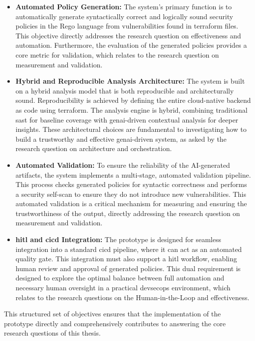 \begin{itemize}
\item \textbf{Automated Policy Generation:} The system's primary function is to automatically generate syntactically correct and logically sound security policies in the Rego language from vulnerabilities found in \gls{terraform} files. This objective directly addresses the research question on effectiveness and automation. Furthermore, the evaluation of the generated policies provides a core metric for validation, which relates to the research question on measurement and validation.

\item \textbf{Hybrid and Reproducible Analysis Architecture:} The system is built on a hybrid analysis model that is both reproducible and architecturally sound. Reproducibility is achieved by defining the entire \gls{cloud-native} backend as code using \gls{terraform}. The analysis engine is hybrid, combining traditional \gls{sast} for baseline coverage with \gls{genai}-driven contextual analysis for deeper insights. These architectural choices are fundamental to investigating how to build a trustworthy and effective \gls{genai}-driven system, as asked by the research question on architecture and orchestration.

\item \textbf{Automated Validation:} To ensure the reliability of the AI-generated artifacts, the system implements a multi-stage, automated validation pipeline. This process checks generated policies for syntactic correctness and performs a security self-scan to ensure they do not introduce new vulnerabilities. This automated validation is a critical mechanism for measuring and ensuring the trustworthiness of the output, directly addressing the research question on measurement and validation.

\item \textbf{\gls{hitl} and \gls{cicd} Integration:} The prototype is designed for seamless integration into a standard \gls{cicd} pipeline, where it can act as an automated quality gate. This integration must also support a \gls{hitl} workflow, enabling human review and approval of generated policies. This dual requirement is designed to explore the optimal balance between full automation and necessary human oversight in a practical \gls{devsecops} environment, which relates to the research questions on the Human-in-the-Loop and effectiveness.
\end{itemize}

This structured set of objectives ensures that the implementation of the prototype directly and comprehensively contributes to answering the core research questions of this thesis.

